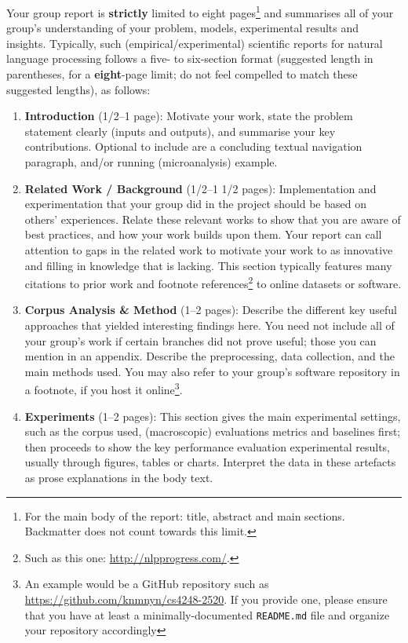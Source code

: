 \documentclass[11pt]{article}
\begin{document}
Your group report is {\bf strictly} limited to eight pages\footnote{For the main body of the report: title, abstract and main sections. Backmatter does not count towards this limit.} and summarises all of your group's understanding of your problem, models, experimental results and insights.  Typically, such (empirical/experimental) scientific reports for natural language processing follows a five- to six-section format ({}suggested length in parentheses, for a {\bf eight}-page limit; do not feel compelled to match these suggested lengths), as follows:

\begin{enumerate}
    \item {\bf Introduction} (1/2--1 page): Motivate your work, state the problem statement clearly (inputs and outputs), and summarise your key contributions.  Optional to include are a concluding textual navigation paragraph, and/or running (microanalysis) example. 
    \item {\bf Related Work / Background} (1/2--1 1/2 pages): Implementation and experimentation that your group did in the project should be based on others' experiences.  Relate these relevant works to show that you are aware of best practices, and how your work builds upon them.  Your report can call attention to gaps in the related work to motivate your work to as innovative and filling in knowledge that is lacking.  This section typically features many citations to prior work and footnote references\footnote{Such as this one: \url{http://nlpprogress.com/}.} to online datasets or software.
    \item {\bf Corpus Analysis \& Method} (1--2 pages): Describe the different key useful approaches that yielded interesting findings here.  You need not include all of your group's work if certain branches did not prove useful; those you can mention in an appendix.  Describe the preprocessing, data collection, and the main methods used. You may also refer to your group's software repository in a footnote, if you host it online\footnote{An example would be a GitHub repository such as \url{https://github.com/knmnyn/cs4248-2520}. If you provide one, please ensure that you have at least a minimally-documented {\tt README.md} file and organize your repository accordingly}. 
    \item {\bf Experiments} (1--2 pages): This section gives the main experimental settings, such as the corpus used, (macroscopic) evaluations metrics and baselines first; then proceeds to show the key performance evaluation experimental results, usually through figures, tables or charts.  Interpret the data in these artefacts as prose explanations in the body text.

\end{enumerate}
\end{document}
